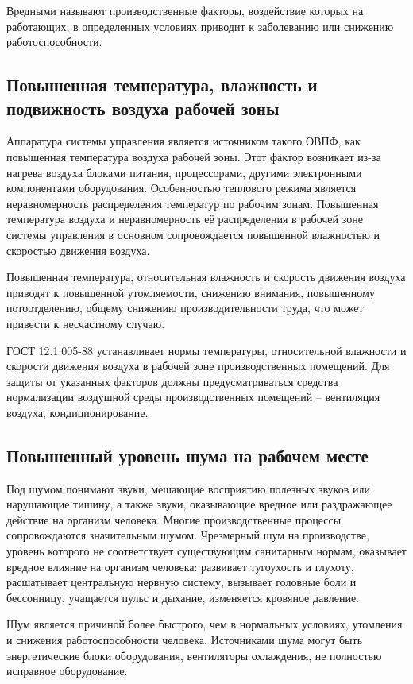 Вредными называют производственные факторы, воздействие которых на работающих, в определенных условиях приводит к заболеванию или снижению работоспособности.

\subsection{Повышенная температура, влажность и подвижность воздуха рабочей зоны}

Аппаратура системы управления является источником такого ОВПФ, как повышенная температура воздуха рабочей зоны. Этот фактор возникает из-за нагрева воздуха блоками питания, процессорами, другими электронными компонентами оборудования. Особенностью теплового режима является неравномерность распределения температур по рабочим зонам. Повышенная температура воздуха и неравномерность её распределения в рабочей зоне системы управления в основном сопровождается повышенной влажностью и скоростью движения воздуха.

Повышенная температура, относительная влажность и скорость движения воздуха приводят к повышенной утомляемости, снижению внимания, повышенному потоотделению, общему снижению производительности труда, что может привести к несчастному случаю. 

ГОСТ 12.1.005-88 устанавливает нормы температуры, относительной влажности и скорости движения воздуха в рабочей зоне производственных помещений. Для защиты от указанных факторов должны предусматриваться средства нормализации воздушной среды производственных помещений – вентиляция воздуха, кондиционирование.

\subsection{Повышенный уровень шума на рабочем месте}

Под шумом понимают звуки, мешающие восприятию полезных звуков или нарушающие тишину, а также звуки, оказывающие вредное или раздражающее действие на организм человека. Многие производственные процессы сопровождаются значительным шумом. Чрезмерный шум на производстве, уровень которого не соответствует существующим санитарным нормам, оказывает вредное влияние на организм человека: развивает тугоухость и глухоту, расшатывает центральную нервную систему, вызывает головные боли и бессонницу, учащается пульс и дыхание, изменяется кровяное давление. 

Шум является причиной более быстрого, чем в нормальных условиях, утомления и снижения работоспособности человека. Источниками шума могут быть энергетические блоки оборудования, вентиляторы охлаждения, не полностью исправное оборудование. 

